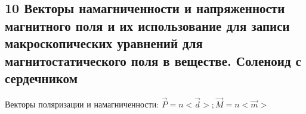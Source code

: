 \documentclass[a4paper,12pt]{article}
\begin{document}
\subsection{10	Векторы намагниченности и напряженности магнитного поля  и их использование для  записи макроскопических уравнений для магнитостатического поля в веществе. Соленоид с сердечником} 
Векторы поляризации и намагниченности: $\vec{P} = n <\vec{d}>; \vec{M} = n<\vec{m}>$\\
\end{document}
